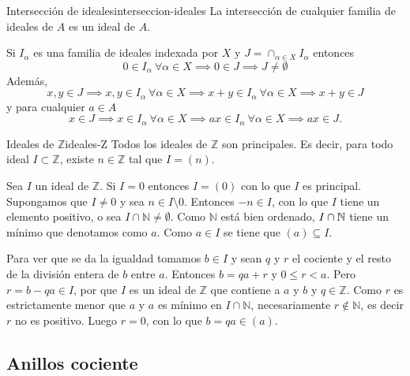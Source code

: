 \begin{proposition}{Intersección de ideales}{interseccion-ideales}
    La intersección de cualquier familia de ideales de \(A\) es un ideal de \(A\).
\end{proposition}

\begin{proofbox}
    Si $I_\alpha$ es una familia de ideales indexada por $X$ y $J = \cap_{\alpha \in X} I_\alpha$ entonces
    \[
    0 \in I_\alpha \ \forall \alpha \in X \implies 0 \in J \implies J \neq \emptyset
    \]
    Además, 
    \[
    x,y \in J \implies x,y \in I_\alpha \ \forall \alpha \in X \implies x+y \in I_\alpha \ \forall \alpha \in X \implies x+y \in J
    \]
    y para cualquier $a \in A$
    \[
    x \in J \implies x \in I_\alpha \ \forall \alpha \in X \implies ax \in I_\alpha \ \forall \alpha \in X \implies ax \in J.
    \]
\end{proofbox}

\begin{proposition}{Ideales de \(\mathbb{Z}\)}{ideales-Z}
    Todos los ideales de \(\mathbb{Z}\) son principales. Es decir, para todo ideal \(I \subset \mathbb{Z}\), existe \(n \in \mathbb{Z}\) tal que \(I = (n)\).
\end{proposition}

\begin{proofbox}
    Sea \(I\) un ideal de \(\mathbb{Z}\). Si \(I=0\) entonces \(I=(0)\) con lo que \(I\) es principal. Supongamos que \(I\neq 0\) y sea \(n\in I\setminus 0\). Entonces \(-n\in I\), con lo que \(I\) tiene un elemento positivo, o sea \(I\cap\mathbb{N}\neq\emptyset\). Como \(\mathbb{N}\) está bien ordenado, \(I \cap \mathbb{N}\) tiene un mínimo que denotamos como \(a\). Como \(a\in I\) se tiene que \((a)\subseteq I\).
    
    Para ver que se da la igualdad tomamos \(b\in I\) y sean \(q\) y \(r\) el cociente y el resto de la división entera de \(b\) entre \(a\). Entonces \(b=qa+r\) y \(0\leq r<a\). Pero \(r=b-qa\in I\), por que \(I\) es un ideal de \(\mathbb{Z}\) que contiene a \(a\) y \(b\) y \(q\in\mathbb{Z}\). Como \(r\) es estrictamente menor que \(a\) y \(a\) es mínimo en \(I\cap\mathbb{N}\), necesariamente \(r\not\in\mathbb{N}\), es decir \(r\) no es positivo. Luego \(r=0\), con lo que \(b=qa\in(a)\).
\end{proofbox}

\subsection{Anillos cociente}

